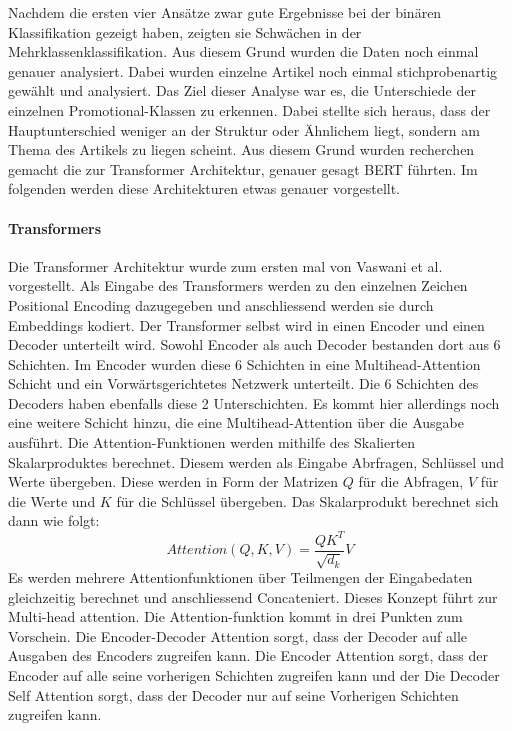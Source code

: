 Nachdem die ersten vier Ansätze zwar gute Ergebnisse bei der binären Klassifikation gezeigt haben, zeigten sie Schwächen in der Mehrklassenklassifikation. Aus diesem Grund wurden die Daten noch einmal genauer analysiert. Dabei wurden einzelne Artikel noch einmal stichprobenartig gewählt und analysiert. Das Ziel dieser Analyse war es, die Unterschiede der einzelnen Promotional-Klassen zu erkennen. Dabei stellte sich heraus, dass der Hauptunterschied weniger an der Struktur oder Ähnlichem liegt, sondern am Thema des Artikels zu liegen scheint. Aus diesem Grund wurden recherchen gemacht die zur Transformer Architektur, genauer gesagt BERT führten. Im folgenden werden diese Architekturen etwas genauer vorgestellt.
\paragraph{Transformers}
Die Transformer Architektur wurde zum ersten mal von Vaswani et al. \cite{Attention} vorgestellt. Als Eingabe des Transformers werden zu den einzelnen Zeichen Positional Encoding dazugegeben und anschliessend werden sie durch Embeddings kodiert. Der Transformer selbst wird in einen Encoder und einen Decoder unterteilt wird. Sowohl Encoder als auch Decoder bestanden dort aus 6 Schichten. Im Encoder wurden diese 6 Schichten in eine Multihead-Attention Schicht und ein Vorwärtsgerichtetes Netzwerk unterteilt. Die 6 Schichten des Decoders haben ebenfalls diese 2 Unterschichten. Es kommt hier allerdings noch eine weitere Schicht hinzu, die eine Multihead-Attention über die Ausgabe ausführt. Die Attention-Funktionen werden mithilfe des Skalierten Skalarproduktes berechnet. Diesem werden als Eingabe Abrfragen, Schlüssel und Werte übergeben. Diese werden in Form der Matrizen $Q$ für die Abfragen, $V$ für die Werte und $K$ für die Schlüssel übergeben. Das Skalarprodukt berechnet sich dann wie folgt:
$${Attention(Q,K,V)} = {\frac{QK^T}{\sqrt{d_k}} V}$$
Es werden mehrere Attentionfunktionen über Teilmengen der Eingabedaten gleichzeitig berechnet und anschliessend Concateniert. Dieses Konzept führt zur Multi-head attention. Die Attention-funktion kommt in drei Punkten zum Vorschein. Die Encoder-Decoder Attention sorgt, dass der Decoder auf alle Ausgaben des Encoders zugreifen kann. Die Encoder Attention sorgt, dass der Encoder auf alle seine vorherigen Schichten zugreifen kann und der Die Decoder Self Attention sorgt, dass der Decoder nur auf seine Vorherigen Schichten zugreifen kann.

